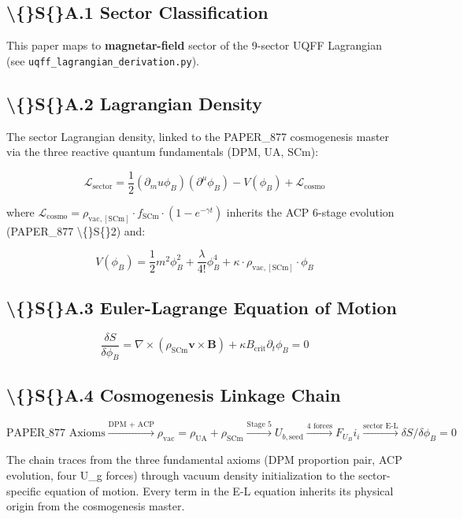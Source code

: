\documentclass[11pt]{article}
\begin{document}
\subsection*{\textbackslash\{\}S\{\}A.1 Sector Classification}

This paper maps to \textbf{magnetar-field} sector of the 9-sector UQFF Lagrangian (see \verb|uqff_lagrangian_derivation.py|).

\subsection*{\textbackslash\{\}S\{\}A.2 Lagrangian Density}

The sector Lagrangian density, linked to the PAPER\_877 cosmogenesis master via the three reactive quantum fundamentals (DPM, UA, SCm):

$$\mathcal{L}_{\mathrm{sector}} = \frac{1}{2}(\partial_mu \phi_B)(\partial^\mu \phi_B) - V(\phi_B) + \mathcal{L}_{\mathrm{cosmo}}$$

where $\mathcal{L}_{\mathrm{cosmo}} = \rho_{\mathrm{vac,[SCm]}} \cdot f_{\mathrm{SCm}} \cdot (1 - e^{-\gamma t})$ inherits the ACP 6-stage evolution (PAPER\_877 \textbackslash\{\}S\{\}2) and:

$$V(\phi_B) = \frac{1}{2} m^2 \phi_B^2 + \frac{\lambda}{4!} \phi_B^4 + \kappa \cdot \rho_{\mathrm{vac,[SCm]}} \cdot \phi_B$$

\subsection*{\textbackslash\{\}S\{\}A.3 Euler-Lagrange Equation of Motion}

$$\boxed{\frac{\delta S}{\delta \phi_B} = \nabla \times (\rho_{\mathrm{SCm}} \mathbf{v} \times \mathbf{B}) + \kappa B_{\mathrm{crit}} \partial_t \phi_B = 0}$$

\subsection*{\textbackslash\{\}S\{\}A.4 Cosmogenesis Linkage Chain}

$$\text{PAPER\_877 Axioms} \xrightarrow{\text{DPM + ACP}} \rho_{\mathrm{vac}} = \rho_{\mathrm{UA}} + \rho_{\mathrm{SCm}} \xrightarrow{\text{Stage 5}} U_{b,\mathrm{seed}} \xrightarrow{\text{4 forces}} F_U_Bi_i \xrightarrow{\text{sector E-L}} \delta S/\delta \phi_B = 0$$

The chain traces from the three fundamental axioms (DPM proportion pair, ACP evolution, four U\_g forces) through vacuum density initialization to the sector-specific equation of motion. Every term in the E-L equation inherits its physical origin from the cosmogenesis master.
\end{document}
